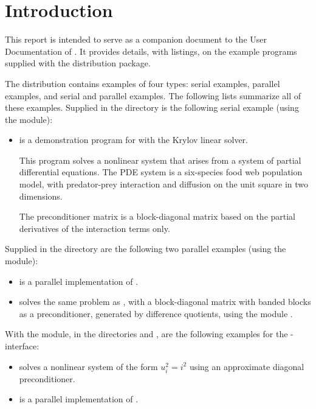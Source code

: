 \section{Introduction}\label{s:ex_intro}

This report is intended to serve as a companion document to the User
Documentation of {\kinsol} \cite{kinsol2.2.0_ug}.  It provides details, with
listings, on the example programs supplied with the {\kinsol} distribution
package.

The {\kinsol} distribution contains examples of four types: serial
{\C} examples, parallel {\C} examples, and serial and parallel {\F}
examples.  The following lists summarize all of these examples.
Supplied in the  directory is the
following serial example (using the {\nvecs} module):

\begin{itemize}
\item {}
  is a demonstration program for {\kinsol} with the Krylov linear solver.

  This program solves a nonlinear system that arises from a system
  of partial differential equations.  The PDE system is a six-species
  food web population model, with predator-prey interaction and diffusion
  on the unit square in two dimensions.

  The preconditioner matrix is a block-diagonal matrix based on
  the partial derivatives of the interaction terms only.
\end{itemize}
Supplied in the  directory are
the following two parallel examples (using the {\nvecp} module):
\begin{itemize}
\item {}
  is a parallel implementation of .
\item {}
  solves the same problem as , with a block-diagonal matrix
  with banded blocks as a preconditioner, generated by difference quotients,
  using the module {\kinbbdpre}.
\end{itemize}
With the {\fkinsol} module, in the directories 
 and
, are the following examples for
the {\F}-{\C} interface:
\begin{itemize}
\item {}
  solves a nonlinear system of the form $u_i^2 = i^2$
  using an approximate diagonal preconditioner.
\item {}
  is a parallel implementation of .
\end{itemize}

